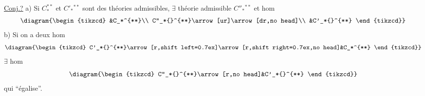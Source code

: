\uline{Conj.?} a) Si $C_*^{**}$ et $C'_*{}^{**}$ sont des théories admissibles, $\exists$ théorie admissible $C''_*{}^{**}$ et hom
\[
\diagram{\begin{tikzcd}
&C_*^{**}\\
C''_*{}^{**}\arrow[ur]\arrow[dr,no head]\\
&C'_*{}^{**}
\end{tikzcd}}
\]
b) Si on a deux hom
\[
\diagram{\begin{tikzcd}
C'_*{}^{**}\arrow[r,shift left=0.7ex]\arrow[r,shift right=0.7ex,no head]&C_*^{**}
\end{tikzcd}}
\]
$\exists$ hom
\[
\diagram{\begin{tikzcd}
C''_*{}^{**}\arrow[r,no head]&C'_*{}^{**}
\end{tikzcd}}
\]
qui ``égalise''.


